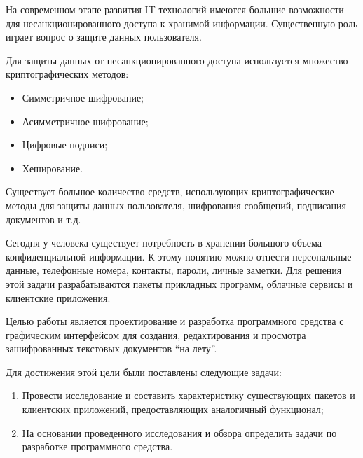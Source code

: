 \newpage
{}

На современном этапе развития IT-технологий имеются большие возможности
для несанкционированного доступа к хранимой информации. Существенную роль
играет вопрос о защите данных пользователя.

Для защиты данных от несанкционированного доступа используется множество
криптографических методов:
\begin{itemize}
    \item Симметричное шифрование;
    \item Асимметричное шифрование;
    \item Цифровые подписи;
    \item Хеширование.
\end{itemize}

Существует большое количество средств, использующих криптографические методы для
защиты данных пользователя, шифрования сообщений, подписания документов и т.д.

Сегодня у человека существует потребность в хранении большого объема конфиденциальной
информации. К этому понятию можно отнести персональные данные, телефонные номера,
контакты, пароли, личные заметки. Для решения этой задачи разрабатываются
пакеты прикладных программ, облачные сервисы и клиентские приложения.

Целью работы является проектирование и разработка программного средства
с графическим интерфейсом для создания, редактирования и просмотра
зашифрованных текстовых документов ``на лету''.

Для достижения этой цели были поставлены следующие задачи:
\begin{enumerate}
    \item Провести исследование и составить характеристику существующих
    пакетов и клиентских приложений, предоставляющих аналогичный функционал;
    \item На основании проведенного исследования и обзора определить
    задачи по разработке программного средства.
\end{enumerate}
